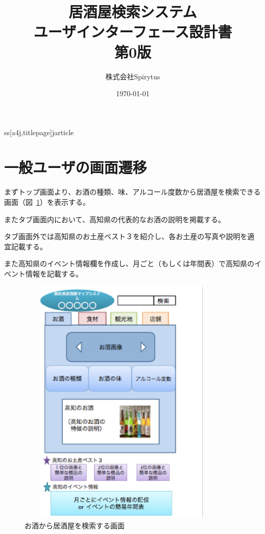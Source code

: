ss[a4j,titlepage]{jarticle}
\usepackage[dvipdfmx]{graphicx}
\usepackage{ascmac}
\usepackage{url}


\title{居酒屋検索システム\\
ユーザインターフェース設計書\\
第0版}
\author{株式会社Spirytus}
\date{\today}


\maketitle
\tableofcontents

\section{一般ユーザの画面遷移}



まずトップ画面より、お酒の種類、味、アルコール度数から居酒屋を検索できる画面（図~\ref{fig:1}）を表示する。



またタブ画面内において、高知県の代表的なお酒の説明を掲載する。



タブ画面外では高知県のお土産ベスト３を紹介し、各お土産の写真や説明を適宜記載する。



また高知県のイベント情報欄を作成し、月ごと（もしくは年間表）で高知県のイベント情報を記載する。



\begin {figure}[!htbp]
    \begin{center}
    \includegraphics [height=12cm, width=10cm]{1.eps}
    \caption {お酒から居酒屋を検索する画面}
    \label {fig:1}
    \end{center}
\end {figure}



